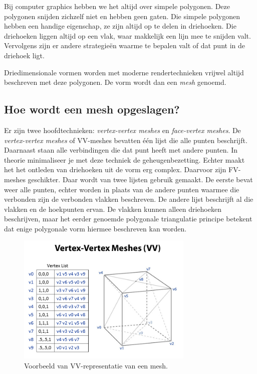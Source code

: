 \documentclass[12pt, a4paper]{article}
\begin{document}
Bij computer graphics hebben we het altijd over simpele polygonen. Deze polygonen snijden zichzelf niet en hebben geen gaten. Die simpele polygonen hebben een handige eigenschap, ze zijn altijd op te delen in driehoeken. Die driehoeken liggen altijd op een vlak, waar makkelijk een lijn mee te snijden valt. Vervolgens zijn er andere strategieën waarme te bepalen valt of dat punt in de driehoek ligt. 

Driedimensionale vormen worden met moderne rendertechnieken vrijwel altijd beschreven met deze polygonen. De vorm wordt dan een \emph{mesh} genoemd.

\subsection{Hoe wordt een mesh opgeslagen?}
Er zijn twee hoofdtechnieken: \emph{vertex-vertex meshes} \cite{VVSystems} en \emph{face-vertex meshes}. De \emph{vertex-vertex meshes} of VV-meshes bevatten één lijst die alle punten beschrijft. Daarnaast staan alle verbindingen die dat punt heeft met andere punten. In theorie minimaliseer je met deze techniek de geheugenbezetting. Echter maakt het het ontleden van driehoeken uit de vorm erg complex. Daarvoor zijn FV-meshes geschikter. Daar wordt van twee lijsten gebruik gemaakt. De eerste bevat weer alle punten, echter worden in plaats van de andere punten waarmee die verbonden zijn de verbonden vlakken beschreven. De andere lijst beschrijft al die vlakken en de hoekpunten ervan. De vlakken kunnen alleen driehoeken beschrijven, maar het eerder genoemde polygonale triangulatie principe betekent dat enige polygonale vorm hiermee beschreven kan worden.

\begin{figure}[h]
    \centering
    \includegraphics[width=0.75\textwidth]{Vertex-Vertex_Meshes.png}
    \caption{Voorbeeld van VV-representatie van een mesh.}
    \label{fig:vertex_vertex}
\end{figure}
\end{document}
